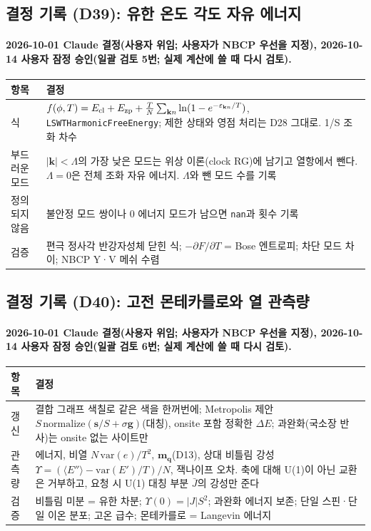 \subsection{결정 기록 (D39): 유한 온도 각도 자유 에너지}\label{decisions-d39-free-energy}
\begingroup%
  \framesubtitle{2026-10-01 Claude 결정(사용자 위임; 사용자가 NBCP 우선을 지정), 2026-10-14 사용자 잠정 승인(일괄 검토 5번; 실제 계산에 쓸 때 다시 검토).}
  \small\renewcommand{\arraystretch}{1.12}
  \begin{tabularx}{\textwidth}{@{}P{3.0cm}Y@{}}
    \toprule
    항목 & 결정 \\
    \midrule
    식 & $f(\phi,T)=E_{\rm cl}+E_{\rm zp}+\frac{T}{N}\sum_{\mathbf k n}\ln(1-e^{-\varepsilon_{\mathbf k n}/T})$, \texttt{LSWTHarmonicFreeEnergy}; 제한 상태와 영점 처리는 D28 그대로. 1/S 조화 차수 \\
    부드러운 모드 & $|\mathbf k|<\Lambda$의 가장 낮은 모드는 위상 이론(clock RG)에 남기고 열항에서 뺀다. $\Lambda=0$은 전체 조화 자유 에너지. $\Lambda$와 뺀 모드 수를 기록 \\
    정의되지 않음 & 불안정 모드 쌍이나 0 에너지 모드가 남으면 \texttt{nan}과 횟수 기록 \\
    검증 & 편극 정사각 반강자성체 닫힌 식; $-\partial F/\partial T$ = Bose 엔트로피; 차단 모드 차이; NBCP Y·V 메쉬 수렴 \\
    \bottomrule
  \end{tabularx}
\endgroup


\subsection{결정 기록 (D40): 고전 몬테카를로와 열 관측량}\label{decisions-d40-monte-carlo}
\begingroup%
  \framesubtitle{2026-10-01 Claude 결정(사용자 위임; 사용자가 NBCP 우선을 지정), 2026-10-14 사용자 잠정 승인(일괄 검토 6번; 실제 계산에 쓸 때 다시 검토).}
  \small\renewcommand{\arraystretch}{1.12}
  \begin{tabularx}{\textwidth}{@{}P{3.0cm}Y@{}}
    \toprule
    항목 & 결정 \\
    \midrule
    갱신 & 결합 그래프 색칠로 같은 색을 한꺼번에; Metropolis 제안 $S\,\mathrm{normalize}(\mathbf s/S+\sigma\mathbf g)$(대칭), onsite 포함 정확한 $\Delta E$; 과완화(국소장 반사)는 onsite 없는 사이트만 \\
    관측량 & 에너지, 비열 $N\,\mathrm{var}(e)/T^2$, $\mathbf m_{\mathbf q}$(D13), 상대 비틀림 강성 $\Upsilon=(\langle E''\rangle-\mathrm{var}(E')/T)/N$, 잭나이프 오차. 축에 대해 U(1)이 아닌 교환은 거부하고, 요청 시 U(1) 대칭 부분 $\bar J$의 강성만 준다 \\
    검증 & 비틀림 미분 = 유한 차분; $\Upsilon(0)=|J|S^2$; 과완화 에너지 보존; 단일 스핀·단일 이온 분포; 고온 급수; 몬테카를로 = Langevin 에너지 \\
    \bottomrule
  \end{tabularx}
\endgroup


